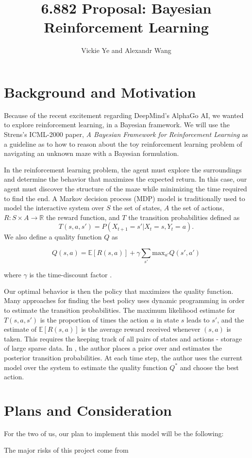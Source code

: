 \documentclass[11pt, twoside]{article}
\title{6.882 Proposal: Bayesian Reinforcement Learning}
\date{}
\author {Vickie Ye and Alexandr Wang}
\begin{document}
\maketitle

\section{Background and Motivation}
Because of the recent excitement regarding DeepMind's AlphaGo AI, we wanted to
explore reinforcement learning, in a Bayesian framework. We will use the Strens's
ICML-2000 paper, \textit{A Bayesian Framework for Reinforcement Learning} as a
guideline as to how to reason about the toy reinforcement learning problem of
navigating an unknown maze with a Bayesian formulation.

In the reinforcement learning problem, the agent must explore the surroundings
and determine the behavior that maximizes the expected return. In this case, our
agent must discover the structure of the maze while minimizing the time required
to find the end. A Markov decision process (MDP) model is traditionally used to
model the interactive system over $S$ the set of states, $A$ the set of actions,
$R: S \times A \rightarrow \mathbb{R}$ the reward function, and $T$ the transition
probabilities defined as
\begin{equation}
T(s, a, s') = P(X_{t+1} = s' | X_t = s, Y_t = a).
\end{equation}
We also define a quality function $Q$ as

\begin{equation}
Q(s, a) = \mathbb{E}[R(s, a)] + \gamma \sum_{s'} \textrm{max}_{a'} Q(s', a')
\end{equation}

where $\gamma$ is the time-discount factor \citep[p.3]{strens}.

Our optimal behavior is then the policy that maximizes the quality function. Many
approaches for finding the best policy uses dynamic programming in order to estimate
the transition probabilities. The maximum likelihood estimate for $T(s, a, s')$ is
the proportion of times the action $a$ in state $s$ leads to $s'$, and the estimate of
$\mathbb{E}[R(s, a)]$ is the average reward received whenever $(s, a)$ is taken. This
requires the keeping track of all pairs of states and actions - storage of large
sparse data. In \cite{strens}, the author places a prior over and estimates the
posterior transition probabilities. At each time step, the author uses the current
model over the system to estimate the quality function $Q^*$ and choose the best
action. 

\section{Plans and Consideration}

For the two of us, our plan to implement this model will be the following:


The major risks of this project come from



\end{document}
